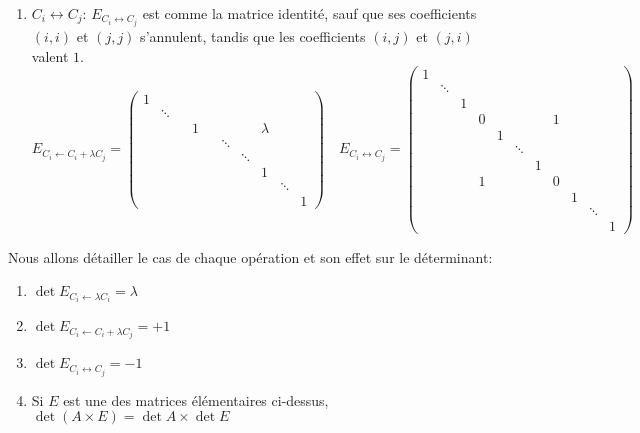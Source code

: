 \documentclass[class=report,crop=false]{standalone}
\begin{document}
\begin{enumerate}
  \item $C_i \leftrightarrow C_j$: $E_{C_i \leftrightarrow C_j}$ est comme la matrice identité,
  sauf que ses coefficients $(i,i)$ et $(j,j)$ s'annulent, tandis que les coefficients
  $(i,j)$ et $(j,i)$ valent $1$.
\[
E_{C_i \leftarrow C_i+\lambda C_j} = \left( \begin{smallmatrix}
1 \\ & \ddots \\ &&& 1 &&&& \lambda \\ &&&&& \ddots \\&&&&&& \ddots \\
&&&&&&& 1 \\ &&&&&&&& \ddots \\ &&&&&&&&& 1
\end{smallmatrix} \right) \quad
E_{C_i \leftrightarrow C_j} = \left( \begin{smallmatrix}
1 \\ & \ddots \\ && 1 \\ &&& 0 &&&& 1 \\ &&&& 1 \\ &&&&& \ddots \\&&&&&& 1 \\ &&& 1 &&&& 0 \\
&&&&&&&& 1 \\ &&&&&&&&& \ddots \\ &&&&&&&&&& 1
\end{smallmatrix} \right)
\]
\end{enumerate}

Nous allons détailler le cas de chaque opération et son effet sur le déterminant:
\begin{proposition}
\label{prop: detelementaire}
\sauteligne
\begin{enumerate}
  \item $\det E_{C_i \leftarrow \lambda C_i} = \lambda$
  \item $\det E_{C_i \leftarrow C_i+\lambda C_j} = +1$
  \item $\det E_{C_i \leftrightarrow C_j} = -1$
  \item Si $E$ est une des matrices élémentaires ci-dessus, $\det \left( A \times E \right) = \det A \times \det E$
\end{enumerate}
\end{proposition}
\end{document}
